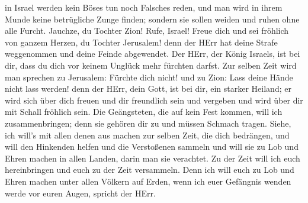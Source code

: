 in Israel werden kein Böses tun noch Falsches reden, und man wird in
ihrem Munde keine betrügliche Zunge finden; sondern sie sollen weiden
und ruhen ohne alle Furcht.  Jauchze, du Tochter Zion!
Rufe, Israel! Freue dich und sei fröhlich von ganzem Herzen, du Tochter
Jerusalem!  denn der HErr hat deine Strafe weggenommen und
deine Feinde abgewendet. Der HErr, der König Israels, ist bei dir, dass
du dich vor keinem Unglück mehr fürchten darfst.  Zur
selben Zeit wird man sprechen zu Jerusalem: Fürchte dich nicht! und zu
Zion: Lass deine Hände nicht lass werden!  denn der HErr,
dein Gott, ist bei dir, ein starker Heiland; er wird sich über dich
freuen und dir freundlich sein und vergeben und wird über dir mit Schall
fröhlich sein.  Die Geängsteten, die auf kein Fest kommen,
will ich zusammenbringen; denn sie gehören dir zu und müssen Schmach
tragen.  Siehe, ich will's mit allen denen aus machen zur
selben Zeit, die dich bedrängen, und will den Hinkenden helfen und die
Verstoßenen sammeln und will sie zu Lob und Ehren machen in allen
Landen, darin man sie verachtet.  Zu der Zeit will ich euch
hereinbringen und euch zu der Zeit versammeln. Denn ich will euch zu Lob
und Ehren machen unter allen Völkern auf Erden, wenn ich euer Gefängnis
wenden werde vor euren Augen, spricht der HErr.
